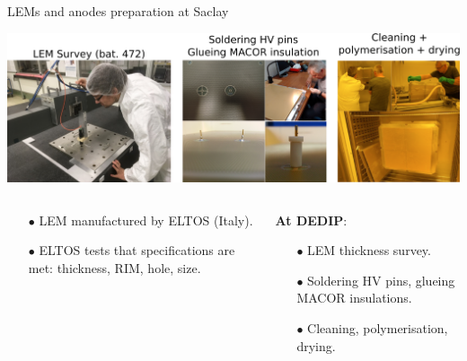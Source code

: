 \documentclass[10pt]{beamer}
\begin{document}
    \begin{frame}{LEMs and anodes preparation at Saclay}
    	\begin{scriptsize}
    		\begin{center}
		    	\includegraphics[width=\textwidth]{figures/666/pretest.png}
	    	\end{center}
	    	\begin{columns}
	    		\begin{column}{0.5\textwidth}
	    			\begin{itemize}
	    				\item[$\bullet$] LEM manufactured by ELTOS (Italy).
	    				\item[$\bullet$] ELTOS tests that specifications are met: thickness, RIM, hole, size.
	    			\end{itemize}
	    		\end{column}\hfill
	    		\begin{column}{0.5\textwidth}
	    			\textbf{At DEDIP}:
	    			\begin{itemize}
	    				\item[$\bullet$] LEM thickness survey.
	    				\item[$\bullet$] Soldering HV pins, glueing MACOR insulations.
	    				\item[$\bullet$] Cleaning, polymerisation, drying.
	    			\end{itemize}
	    		\end{column}
	    	\end{columns}
	    \end{scriptsize} 
    \end{frame}
    
\end{document}
